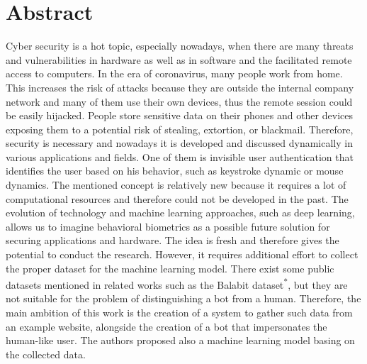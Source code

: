 \section{Abstract}\label{sec:abstract}
Cyber security is a hot topic, especially nowadays, when there are many threats and vulnerabilities in hardware as well as in software and the facilitated remote access to computers.
In the era of coronavirus, many people work from home.
This increases the risk of attacks because they are outside the internal company network and many of them use their own devices, thus the remote session could be easily hijacked.
People store sensitive data on their phones and other devices exposing them to a potential risk of stealing, extortion, or blackmail.
Therefore, security is necessary and nowadays it is developed and discussed dynamically in various applications and fields.
One of them is invisible user authentication that identifies the user based on his behavior, such as keystroke dynamic or mouse dynamics.
The mentioned concept is relatively new because it requires a lot of computational resources and therefore could not be developed in the past.
The evolution of technology and machine learning approaches, such as deep learning, allows us to imagine behavioral biometrics as a possible future solution for securing applications and hardware.
The idea is fresh and therefore gives the potential to conduct the research.
However, it requires additional effort to collect the proper dataset for the machine learning model.
There exist some public datasets mentioned in related works such as the Balabit dataset\textsuperscript{*}, but they are not suitable for the problem of distinguishing a bot from a human.
Therefore, the main ambition of this work is the creation of a system to gather such data from an example website, alongside the creation of a bot that impersonates the human-like user.
The authors proposed also a machine learning model basing on the collected data.

